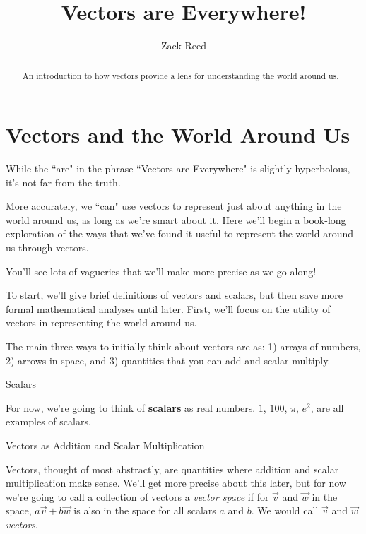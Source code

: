 \documentclass{ximera}
\author{Zack Reed}
\title{Vectors are Everywhere!}
\begin{document}
\begin{abstract}
    An introduction to how vectors provide a lens for understanding the world around us.
\end{abstract}
\maketitle


\section{Vectors and the World Around Us}

While the ``are" in the phrase ``Vectors are Everywhere" is slightly hyperbolous, it's not far from the truth. 

More accurately, we ``can" use vectors to represent just about anything in the world around us, as long as we're smart about it. Here we'll begin a book-long exploration of the ways that we've found it useful to represent the world around us through vectors. 

You'll see lots of vagueries that we'll make more precise as we go along!

\begin{remark}

  To start, we'll give brief definitions of vectors and scalars, but then save more formal mathematical analyses until later. First, we'll focus on the utility of vectors in representing the world around us.

  The main three ways to initially think about vectors are as: 1) arrays of numbers, 2) arrows in space, and 3) quantities that you can add and scalar multiply.

  \begin{definition}{Scalars}

    For now, we're going to think of \textbf{scalars} as real numbers. $1$, $100$, $\pi$, $e^2$, are all examples of scalars.

  \end{definition}

  \begin{definition}{Vectors as Addition and Scalar Multiplication}

    Vectors, thought of most abstractly, are quantities where addition and scalar multiplication make sense. We'll get more precise about this later, but for now we're going to call a collection of vectors a \textit{vector space} if for $\vec{v}$ and $\vec{w}$ in the space, $a\vec{v}+b\vec{w}$ is also in the space for all scalars $a$ and $b$. We would call $\vec{v}$ and $\vec{w}$ \textit{vectors}.

  \end{definition}

\end{remark}
\end{document}
